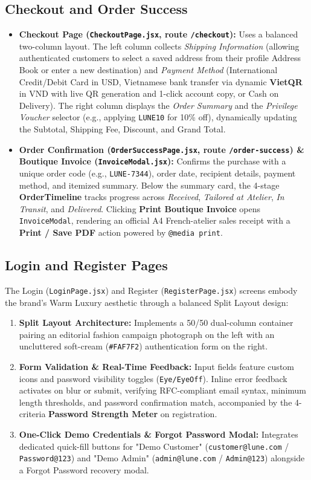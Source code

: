 \documentclass[12pt,a4paper,oneside]{report}
\begin{document}
\subsection{Checkout and Order Success}
\begin{itemize}[leftmargin=1.2cm]
    \item \textbf{Checkout Page (\texttt{CheckoutPage.jsx}, route \texttt{/checkout}):} Uses a balanced two-column layout. The left column collects \textit{Shipping Information} (allowing authenticated customers to select a saved address from their profile Address Book or enter a new destination) and \textit{Payment Method} (International Credit/Debit Card in USD, Vietnamese bank transfer via dynamic \textbf{VietQR} in VND with live QR generation and 1-click account copy, or Cash on Delivery). The right column displays the \textit{Order Summary} and the \textit{Privilege Voucher} selector (e.g., applying \texttt{LUNE10} for 10\% off), dynamically updating the Subtotal, Shipping Fee, Discount, and Grand Total.
    \item \textbf{Order Confirmation (\texttt{OrderSuccessPage.jsx}, route \texttt{/order-success}) \& Boutique Invoice (\texttt{InvoiceModal.jsx}):} Confirms the purchase with a unique order code (e.g., \texttt{LUNE-7344}), order date, recipient details, payment method, and itemized summary. Below the summary card, the 4-stage \textbf{OrderTimeline} tracks progress across \textit{Received}, \textit{Tailored at Atelier}, \textit{In Transit}, and \textit{Delivered}. Clicking \textbf{Print Boutique Invoice} opens \texttt{InvoiceModal}, rendering an official A4 French-atelier sales receipt with a \textbf{Print / Save PDF} action powered by \texttt{@media print}.
\end{itemize}

\subsection{Login and Register Pages}
The Login (\texttt{LoginPage.jsx}) and Register (\texttt{RegisterPage.jsx}) screens embody the brand's Warm Luxury aesthetic through a balanced Split Layout design:
\begin{enumerate}[leftmargin=1.2cm]
    \item \textbf{Split Layout Architecture:} Implements a 50/50 dual-column container pairing an editorial fashion campaign photograph on the left with an uncluttered soft-cream (\texttt{\#FAF7F2}) authentication form on the right.
    \item \textbf{Form Validation \& Real-Time Feedback:} Input fields feature custom icons and password visibility toggles (\texttt{Eye/EyeOff}). Inline error feedback activates on blur or submit, verifying RFC-compliant email syntax, minimum length thresholds, and password confirmation match, accompanied by the 4-criteria \textbf{Password Strength Meter} on registration.
    \item \textbf{One-Click Demo Credentials \& Forgot Password Modal:} Integrates dedicated quick-fill buttons for "Demo Customer" (\texttt{customer@lune.com} / \texttt{Password@123}) and "Demo Admin" (\texttt{admin@lune.com} / \texttt{Admin@123}) alongside a Forgot Password recovery modal.
\end{enumerate}
\end{document}
